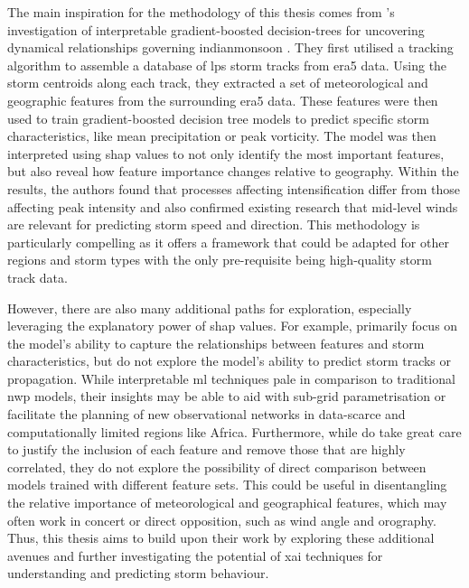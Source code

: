 The main inspiration for the methodology of this thesis comes from \cite{Hunt2024}'s investigation of interpretable gradient-boosted decision-trees for uncovering dynamical relationships governing \gls{indianmonsoon} . They first utilised a tracking algorithm to assemble a database of \acrshort{lps} storm tracks from \acrshort{era5} data. Using the storm centroids along each track, they extracted a set of meteorological and geographic features from the surrounding \acrshort{era5} data. These features were then used to train gradient-boosted decision tree models to predict specific storm characteristics, like mean precipitation or peak vorticity. The model was then interpreted using \acrshort{shap} values to not only identify the most important features, but also reveal how feature importance changes relative to geography. Within the results, the authors found that processes affecting intensification differ from those affecting peak intensity and also confirmed existing research that mid-level winds are relevant for predicting storm speed and direction. This methodology is particularly compelling as it offers a framework that could be adapted for other regions and storm types with the only pre-requisite being high-quality storm track data.

However, there are also many additional paths for exploration, especially leveraging the explanatory power of \acrshort{shap} values. For example, \cite{Hunt2024} primarily focus on the model's ability to capture the relationships between features and storm characteristics, but do not explore the model's ability to predict storm tracks or propagation. While interpretable \acrshort{ml} techniques pale in comparison to traditional \acrshort{nwp} models, their insights may be able to aid with sub-grid parametrisation or facilitate the planning of new observational networks in data-scarce and computationally limited regions like Africa. Furthermore, while \cite{Hunt2024} do take great care to justify the inclusion of each feature and remove those that are highly correlated, they do not explore the possibility of direct comparison between models trained with different feature sets. This could be useful in disentangling the relative importance of meteorological and geographical features, which may often work in concert or direct opposition, such as wind angle and orography. Thus, this thesis aims to build upon their work by exploring these additional avenues and further investigating the potential of \acrshort{xai} techniques for understanding and predicting storm behaviour.

